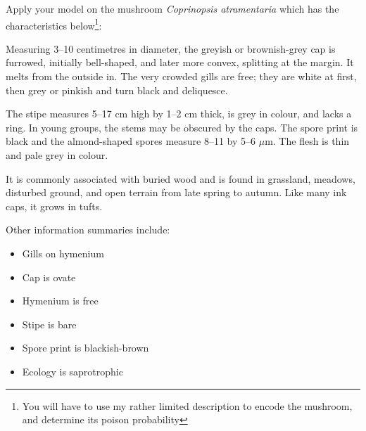 \documentclass[12pt]{article}
\begin{document}
\begin{enumerate}
Apply your model on the mushroom \textsl{Coprinopsis atramentaria} which has the characteristics below\footnote{You will have to use my rather limited description to encode the mushroom, and determine its poison probability}:

Measuring 3–10 centimetres in diameter, the greyish or brownish-grey cap is furrowed, initially bell-shaped, and later more convex, splitting at the margin. It melts from the outside in. The very crowded gills are free; they are white at first, then grey or pinkish and turn black and deliquesce.

The stipe measures 5–17 cm  high by 1–2 cm thick, is grey in colour, and lacks a ring. In young groups, the stems may be obscured by the caps. The spore print is black and the almond-shaped spores measure 8–11 by 5–6 $\mu$m. The flesh is thin and pale grey in colour.

It is commonly associated with buried wood and is found in grassland, meadows, disturbed ground, and open terrain from late spring to autumn. Like many ink caps, it grows in tufts.

Other information summaries include:

\begin{itemize}
\item Gills on hymenium
\item Cap is ovate
\item Hymenium is free
\item Stipe is bare
\item Spore print is blackish-brown
\item Ecology is saprotrophic
\end{itemize}
    

\clearpage


\end{enumerate}
\end{document}
